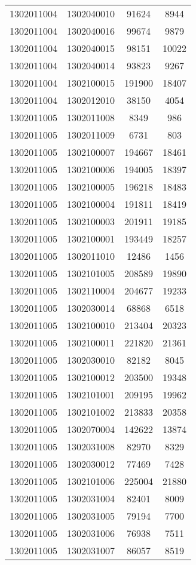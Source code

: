 \begin{longtable}{llcc}
1302011004 & 1302040010 & 91624 & 8944\\
1302011004 & 1302040016 & 99674 & 9879\\
1302011004 & 1302040015 & 98151 & 10022\\
1302011004 & 1302040014 & 93823 & 9267\\
1302011004 & 1302100015 & 191900 & 18407\\
1302011004 & 1302012010 & 38150 & 4054\\
1302011005 & 1302011008 & 8349 & 986\\
1302011005 & 1302011009 & 6731 & 803\\
1302011005 & 1302100007 & 194667 & 18461\\
1302011005 & 1302100006 & 194005 & 18397\\
1302011005 & 1302100005 & 196218 & 18483\\
1302011005 & 1302100004 & 191811 & 18419\\
1302011005 & 1302100003 & 201911 & 19185\\
1302011005 & 1302100001 & 193449 & 18257\\
1302011005 & 1302011010 & 12486 & 1456\\
1302011005 & 1302101005 & 208589 & 19890\\
1302011005 & 1302110004 & 204677 & 19233\\
1302011005 & 1302030014 & 68868 & 6518\\
1302011005 & 1302100010 & 213404 & 20323\\
1302011005 & 1302100011 & 221820 & 21361\\
1302011005 & 1302030010 & 82182 & 8045\\
1302011005 & 1302100012 & 203500 & 19348\\
1302011005 & 1302101001 & 209195 & 19962\\
1302011005 & 1302101002 & 213833 & 20358\\
1302011005 & 1302070004 & 142622 & 13874\\
1302011005 & 1302031008 & 82970 & 8329\\
1302011005 & 1302030012 & 77469 & 7428\\
1302011005 & 1302101006 & 225004 & 21880\\
1302011005 & 1302031004 & 82401 & 8009\\
1302011005 & 1302031005 & 79194 & 7700\\
1302011005 & 1302031006 & 76938 & 7511\\
1302011005 & 1302031007 & 86057 & 8519\\

\end{longtable}
